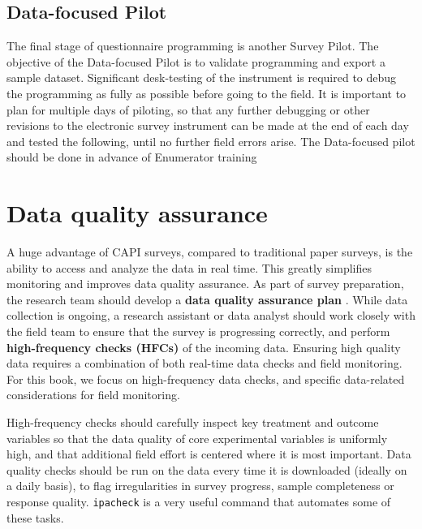 {\subsection{Data-focused Pilot}
The final stage of questionnaire programming is another Survey Pilot. The objective of the Data-focused Pilot  is to validate programming and export a sample dataset. Significant desk-testing of the instrument is required to debug the programming as fully as possible before going to the field. It is important to plan for multiple days of piloting, so that any further debugging or other revisions to the electronic survey instrument can be made at the end of each day and tested the following, until no further field errors arise. The Data-focused pilot should be done in advance of Enumerator training



\section{Data quality assurance}
A huge advantage of CAPI surveys, compared to traditional paper surveys, is the ability to access and analyze the data in real time. 
This greatly simplifies monitoring and improves data quality assurance. As part of survey preparation, the research team should develop a 
\textbf{data quality assurance plan} . While data collection is ongoing, a research assistant or data analyst should work closely with the field team to ensure that the survey is progressing correctly, and perform \textbf{high-frequency checks (HFCs)} of the incoming data. 
Ensuring high quality data requires a combination of both real-time data checks and field monitoring. For this book, we focus on high-frequency data checks, and specific data-related considerations for field monitoring.

High-frequency checks should carefully inspect key treatment and outcome variables so that the data quality of core experimental variables is uniformly high, and that additional field effort is centered where it is most important. 
Data quality checks should be run on the data every time it is downloaded (ideally on a daily basis), to flag irregularities in survey progress, sample completeness or response quality. \texttt{ipacheck} 
is a very useful command that automates some of these tasks.

}
